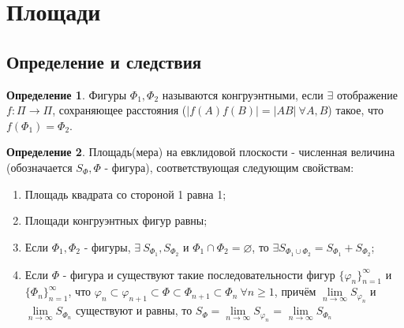 \documentclass[a4paper, 12pt]{article}
\renewcommand{\phi}{\varphi}
\theoremstyle{definition}
\newtheorem*{definition}{Определение}
\begin{document}
	\section{Площади}
	\subsection{Определение и следствия}
	\begin{definition}
		Фигуры $\Phi_{1}, \Phi_{2}$ называются конгруэнтными, если $\exists$ отображение $f: \Pi \rightarrow \Pi$, сохраняющее расстояния ($|f(A)f(B)| = |AB| \ \forall A, B$) такое, что $f(\Phi_{1}) = \Phi_{2}$.
	\end{definition}
	\begin{definition}
		Площадь(мера) на евклидовой плоскости - численная величина (обозначается $S_{\Phi}, \Phi$ - фигура), соответствующая следующим свойствам:
		\begin{enumerate}
			\item Площадь квадрата со стороной 1 равна 1;
			\item Площади конгруэнтных фигур равны;
			\item Если $\Phi_{1}, \Phi_{2}$ - фигуры, $\exists \ S_{\Phi_{1}}, S_{\Phi_{2}}$ и $\Phi_{1} \cap \Phi_{2} = \varnothing$, то $\exists S_{\Phi_{1}\cup\Phi_{2}} = S_{\Phi_{1}} + S_{\Phi_{2}}$; 
			\item Если $\Phi$ - фигура и существуют такие последовательности фигур $\{\phi_{n}\}_{n=1}^{\infty}$ и $\{\Phi_{n}\}_{n=1}^{\infty}$, что $\phi_{n} \subset \phi_{n+1} \subset \Phi \subset \Phi_{n+1} \subset \Phi_{n} \ \forall n \geqslant 1$, причём $\lim \limits_{n\rightarrow\infty}S_{\phi_{n}}$ и $\lim \limits_{n\rightarrow\infty}S_{\Phi_{n}}$ существуют и равны, то $S_{\Phi} = \lim \limits_{n\rightarrow\infty}S_{\phi_{n}}$ = $\lim \limits_{n\rightarrow\infty}S_{\Phi_{n}}$
		\end{enumerate} 
	\end{definition}
\end{document}
